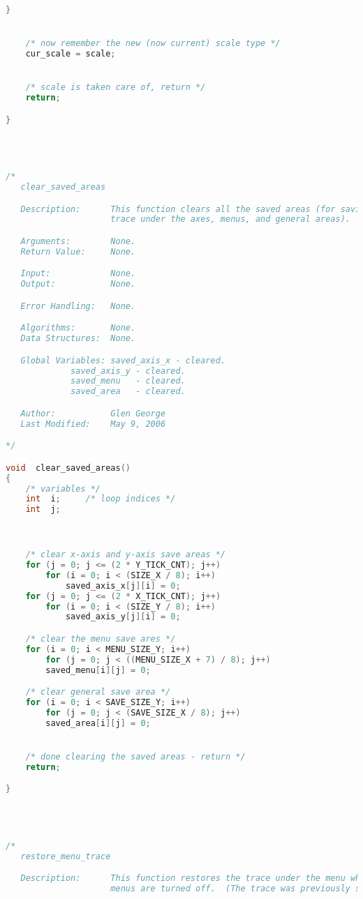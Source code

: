 \begin{lstlisting}[language=C]
    }


    /* now remember the new (now current) scale type */
    cur_scale = scale;


    /* scale is taken care of, return */
    return;

}




/*
   clear_saved_areas

   Description:      This function clears all the saved areas (for saving the
                     trace under the axes, menus, and general areas).

   Arguments:        None.
   Return Value:     None.

   Input:            None.
   Output:           None.

   Error Handling:   None.

   Algorithms:       None.
   Data Structures:  None.

   Global Variables: saved_axis_x - cleared.
		     saved_axis_y - cleared.
		     saved_menu   - cleared.
		     saved_area   - cleared.

   Author:           Glen George
   Last Modified:    May 9, 2006

*/

void  clear_saved_areas()
{
    /* variables */
    int  i;		/* loop indices */
    int  j;



    /* clear x-axis and y-axis save areas */
    for (j = 0; j <= (2 * Y_TICK_CNT); j++)
        for (i = 0; i < (SIZE_X / 8); i++)
            saved_axis_x[j][i] = 0;
    for (j = 0; j <= (2 * X_TICK_CNT); j++)
        for (i = 0; i < (SIZE_Y / 8); i++)
            saved_axis_y[j][i] = 0;

    /* clear the menu save ares */
    for (i = 0; i < MENU_SIZE_Y; i++)
        for (j = 0; j < ((MENU_SIZE_X + 7) / 8); j++)
	    saved_menu[i][j] = 0;

    /* clear general save area */
    for (i = 0; i < SAVE_SIZE_Y; i++)
        for (j = 0; j < (SAVE_SIZE_X / 8); j++)
	    saved_area[i][j] = 0;


    /* done clearing the saved areas - return */
    return;

}




/*
   restore_menu_trace

   Description:      This function restores the trace under the menu when the
                     menus are turned off.  (The trace was previously saved.)


\end{lstlisting}
